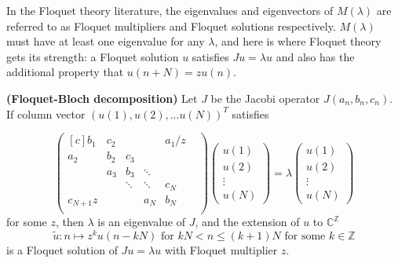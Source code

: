 \documentclass[../main.tex]{subfiles}
\begin{document}
In the Floquet theory literature, the eigenvalues and eigenvectors of $M(\lambda)$ are referred to as Floquet multipliers and Floquet solutions respectively. $M(\lambda)$ must have at least one eigenvalue for any $\lambda$, and here is where Floquet theory gets its strength: a Floquet solution $u$ satisfies $Ju = \lambda u$ and also has the additional property that $u(n+N) = zu(n).$
\begin{proposition}{\textbf{(Floquet-Bloch decomposition)}}
Let $J$ be the Jacobi operator $J(a_n, b_n, c_n)$. If column vector $(u(1), u(2), ... u(N))^T$ satisfies

\begin{equation}\label{eqn:floquet-bloch}
\begin{pmatrix*}[c]
b_1 & c_2 & & & a_1/z\\
a_2 & b_2 & c_3 & & & \\
& a_3 & b_3 & \ddots & & \\
& & \ddots & \ddots & c_N & \\
c_{N+1} z & & & a_N & b_N\\
\end{pmatrix*}
\begin{pmatrix*}
u(1) \\
u(2) \\
\vdots \\
u(N)
\end{pmatrix*}
= \lambda
\begin{pmatrix*}
u(1) \\
u(2) \\
\vdots \\
u(N)
\end{pmatrix*}
\end{equation}
for some $z$, then $\lambda$ is an eigenvalue of $J$, and the extension of $u$ to $\mathbb{C}^\mathbb{Z}$
$$\tilde{u}: n \mapsto
z^{k}u(n - kN) \text{ for } kN < n \leq (k+1)N\text{ for some } k \in \mathbb{Z}
$$
is a Floquet solution of $Ju = \lambda u$ with Floquet multiplier $z$.

\end{proposition}
\end{document}
